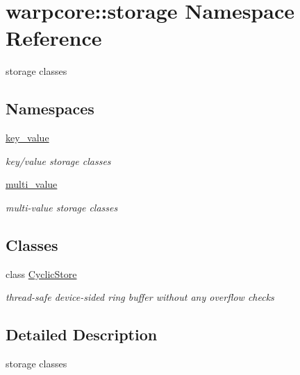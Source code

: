 \hypertarget{namespacewarpcore_1_1storage}{}\section{warpcore\+:\+:storage Namespace Reference}
\label{namespacewarpcore_1_1storage}


storage classes  


\subsection*{Namespaces}
\begin{DoxyCompactItemize}
\item 
 \hyperlink{namespacewarpcore_1_1storage_1_1key__value}{key\+\_\+value}
\begin{DoxyCompactList}\small\item\em key/value storage classes \end{DoxyCompactList}\item 
 \hyperlink{namespacewarpcore_1_1storage_1_1multi__value}{multi\+\_\+value}
\begin{DoxyCompactList}\small\item\em multi-\/value storage classes \end{DoxyCompactList}\end{DoxyCompactItemize}
\subsection*{Classes}
\begin{DoxyCompactItemize}
\item 
class \hyperlink{classwarpcore_1_1storage_1_1CyclicStore}{Cyclic\+Store}
\begin{DoxyCompactList}\small\item\em thread-\/safe device-\/sided ring buffer without any overflow checks \end{DoxyCompactList}\end{DoxyCompactItemize}


\subsection{Detailed Description}
storage classes 